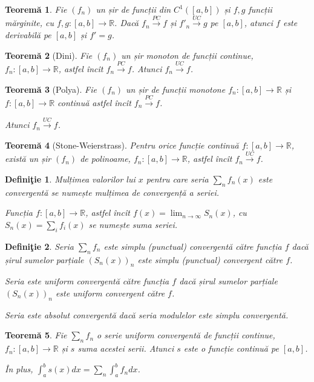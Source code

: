 \documentclass[11pt,a4paper]{article}
\newcommand\ds{\displaystyle}
\newcommand\xrar{\xrightarrow}
\newcommand\RR{\mathbb{R}}
\theoremstyle{dotless}
\newtheorem{theorem}{Teorem\u{a}}[section]
\theoremstyle{dotlessdr}
\newtheorem{definition}{Defini\c{t}ie}[section]
\begin{document}
\begin{theorem}\label{thm:pc-uc-der}
  Fie $(f_n)$ un șir de funcții din $C^1([a,b])$ și $f, g$ funcții mărginite,
  cu $f,g : [a, b] \to \RR$. Dacă $f_n \xrar{PC} f$ și $f'_n \xrar{UC} g$ pe
  $[a, b]$, atunci $f$ este derivabilă pe $[a, b]$ și $f' = g$.
\end{theorem}

\begin{theorem}[Dini]\label{thm:dini}
  Fie $(f_n)$ un șir monoton de funcții continue, $f_n : [a, b] \to \RR$,
  astfel încît $f_n \xrar{PC} f$. Atunci $f_n \xrar{UC} f$.
\end{theorem}

\begin{theorem}[Polya]\label{thm:polya}
  Fie $(f_n)$ un șir de funcții monotone $f_n : [a, b] \to \RR$ și
  $f : [a, b] \to \RR$ continuă astfel încît $f_n \xrar{PC} f$.

  Atunci $f_n \xrar{UC} f$.
\end{theorem}

\begin{theorem}[Stone-Weierstrass]\label{thm:stone-w}
  Pentru orice funcție continuă $f : [a, b] \to \RR$, există un șir $(f_n)$
  de polinoame, $f_n : [a, b] \to \RR$, astfel încît $f_n \xrar{UC} f$.
\end{theorem}

\begin{definition}\label{def:multime-conv}
  Mulțimea valorilor lui $x$ pentru care seria $\sum_n f_n(x)$ este convergentă
  se numește \emph{mulțimea de convergență} a seriei.

  Funcția $f : [a, b] \to \RR$, astfel încît $f(x) = \ds\lim_{n \to \infty} S_n(x)$,
  cu $S_n(x) = \sum_i f_i(x)$ se numește \emph{suma seriei}.
\end{definition}

\begin{definition}\label{def:punctual-conv}
  Seria $\sum_n f_n$ este \emph{simplu (punctual) convergentă} către funcția $f$
  dacă șirul sumelor parțiale $(S_n(x))_n$ este simplu (punctual) convergent
  către $f$.

  Seria este \emph{uniform convergentă} către funcția $f$ dacă șirul sumelor
  parțiale $(S_n(x))_n$ este uniform convergent către $f$.

  Seria este \emph{absolut convergentă} dacă seria modulelor este simplu convergentă.
\end{definition}

\begin{theorem}\label{thm:uc-int}
  Fie $\sum_n f_n$ o serie uniform convergentă de funcții continue, $f_n : [a, b] \to \RR$
  și $s$ suma acestei serii. Atunci $s$ este o funcție continuă pe $[a, b]$.

  În plus, $\int_a^b s(x) dx = \sum_n \int_a^b f_n dx$.
\end{theorem}
\end{document}
